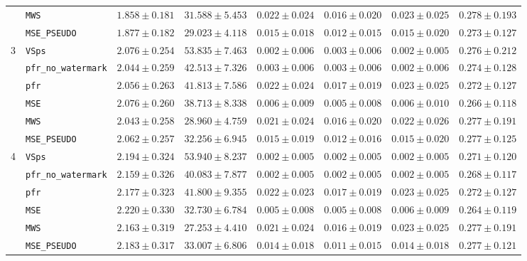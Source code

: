 \documentclass{article}
\theoremstyle{plain}
\theoremstyle{definition}
\begin{document}
\begin{table}[!htbp]
{\begin{tabular}{llcccccc}
 & \texttt{MWS} & $1.858 \pm 0.181$ & $31.588 \pm 5.453$ & $0.022 \pm 0.024$ & $0.016 \pm 0.020$ & $0.023 \pm 0.025$ & $0.278 \pm 0.193$ \\
 & \texttt{MSE\_PSEUDO} & $1.877 \pm 0.182$ & $29.023 \pm 4.118$ & $0.015 \pm 0.018$ & $0.012 \pm 0.015$ & $0.015 \pm 0.020$ & $0.273 \pm 0.127$ \\
\midrule
3  & \texttt{VSps} & $2.076 \pm 0.254$ & $53.835 \pm 7.463$ & $0.002 \pm 0.006$ & $0.003 \pm 0.006$ & $0.002 \pm 0.005$ & $0.276 \pm 0.212$ \\
 & \texttt{pfr\_no\_watermark} & $2.044 \pm 0.259$ & $42.513 \pm 7.326$ & $0.003 \pm 0.006$ & $0.003 \pm 0.006$ & $0.002 \pm 0.006$ & $0.274 \pm 0.128$ \\
 & \texttt{pfr} & $2.056 \pm 0.263$ & $41.813 \pm 7.586$ & $0.022 \pm 0.024$ & $0.017 \pm 0.019$ & $0.023 \pm 0.025$ & $0.272 \pm 0.127$ \\
 & \texttt{MSE} & $2.076 \pm 0.260$ & $38.713 \pm 8.338$ & $0.006 \pm 0.009$ & $0.005 \pm 0.008$ & $0.006 \pm 0.010$ & $0.266 \pm 0.118$ \\
 & \texttt{MWS} & $2.043 \pm 0.258$ & $28.960 \pm 4.759$ & $0.021 \pm 0.024$ & $0.016 \pm 0.020$ & $0.022 \pm 0.026$ & $0.277 \pm 0.191$ \\
 & \texttt{MSE\_PSEUDO} & $2.062 \pm 0.257$ & $32.256 \pm 6.945$ & $0.015 \pm 0.019$ & $0.012 \pm 0.016$ & $0.015 \pm 0.020$ & $0.277 \pm 0.125$ \\
\midrule
4 & \texttt{VSps} & $2.194 \pm 0.324$ & $53.940 \pm 8.237$ & $0.002 \pm 0.005$ & $0.002 \pm 0.005$ & $0.002 \pm 0.005$ & $0.271 \pm 0.120$ \\
 & \texttt{pfr\_no\_watermark} & $2.159 \pm 0.326$ & $40.083 \pm 7.877$ & $0.002 \pm 0.005$ & $0.002 \pm 0.005$ & $0.002 \pm 0.005$ & $0.268 \pm 0.117$ \\
 & \texttt{pfr} & $2.177 \pm 0.323$ & $41.800 \pm 9.355$ & $0.022 \pm 0.023$ & $0.017 \pm 0.019$ & $0.023 \pm 0.025$ & $0.272 \pm 0.127$ \\
 & \texttt{MSE} & $2.220 \pm 0.330$ & $32.730 \pm 6.784$ & $0.005 \pm 0.008$ & $0.005 \pm 0.008$ & $0.006 \pm 0.009$ & $0.264 \pm 0.119$ \\
 & \texttt{MWS} & $2.163 \pm 0.319$ & $27.253 \pm 4.410$ & $0.021 \pm 0.024$ & $0.016 \pm 0.019$ & $0.023 \pm 0.025$ & $0.277 \pm 0.191$ \\
 & \texttt{MSE\_PSEUDO} & $2.183 \pm 0.317$ & $33.007 \pm 6.806$ & $0.014 \pm 0.018$ & $0.011 \pm 0.015$ & $0.014 \pm 0.018$ & $0.277 \pm 0.121$ \\
\bottomrule
\end{tabular}
}
\end{table}
\end{document}
